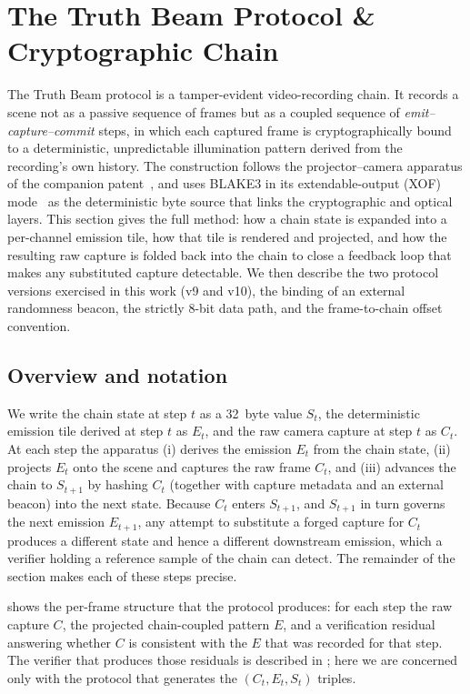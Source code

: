 \section{The Truth Beam Protocol \& Cryptographic Chain}
\label{sec:protocol_chain}

The Truth Beam protocol is a tamper-evident video-recording chain. It records a scene not as a passive sequence of frames but as a coupled sequence of \emph{emit--capture--commit} steps, in which each captured frame is cryptographically bound to a deterministic, unpredictable illumination pattern derived from the recording's own history. The construction follows the projector--camera apparatus of the companion patent~\cite{patent2025}, and uses BLAKE3 in its extendable-output (XOF) mode~\cite{blake3} as the deterministic byte source that links the cryptographic and optical layers. This section gives the full method: how a chain state is expanded into a per-channel emission tile, how that tile is rendered and projected, and how the resulting raw capture is folded back into the chain to close a feedback loop that makes any substituted capture detectable. We then describe the two protocol versions exercised in this work (v9 and v10), the binding of an external randomness beacon, the strictly 8-bit data path, and the frame-to-chain offset convention.

\subsection{Overview and notation}
\label{subsec:pc_overview}

We write the chain state at step $t$ as a \SI{32}{byte} value $S_t$, the deterministic emission tile derived at step $t$ as $E_t$, and the raw camera capture at step $t$ as $C_t$. At each step the apparatus (i) derives the emission $E_t$ from the chain state, (ii) projects $E_t$ onto the scene and captures the raw frame $C_t$, and (iii) advances the chain to $S_{t+1}$ by hashing $C_t$ (together with capture metadata and an external beacon) into the next state. Because $C_t$ enters $S_{t+1}$, and $S_{t+1}$ in turn governs the next emission $E_{t+1}$, any attempt to substitute a forged capture for $C_t$ produces a different state and hence a different downstream emission, which a verifier holding a reference sample of the chain can detect. The remainder of the section makes each of these steps precise.

 shows the per-frame structure that the protocol produces: for each step the raw capture $C$, the projected chain-coupled pattern $E$, and a verification residual answering whether $C$ is consistent with the $E$ that was recorded for that step. The verifier that produces those residuals is described in ; here we are concerned only with the protocol that generates the $(C_t, E_t, S_t)$ triples.

